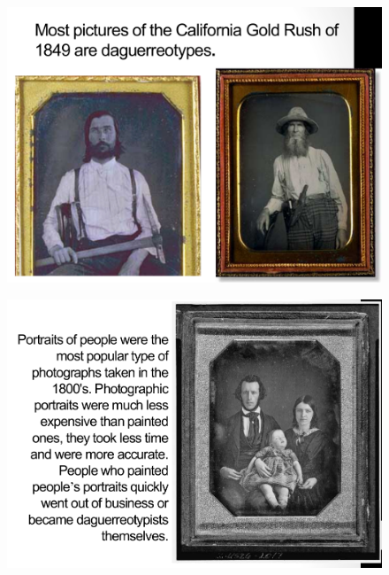 \documentclass{beamer}
\begin{document}
\begin{frame}
	\begin{figure}
		\centering
		\includegraphics[scale=0.4]{87.jpg}
	\end{figure}
\end{frame}

\begin{frame}
	\begin{figure}
		\centering
		\includegraphics[scale=0.4]{88.jpg}
	\end{figure}
\end{frame}
\end{document}
